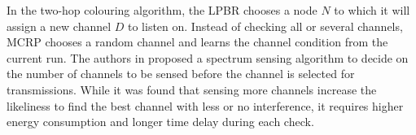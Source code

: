 


In the two-hop colouring algorithm, the LPBR chooses a node $N$ to which it will assign a new channel $D$ to listen on.
Instead of checking all or several channels, MCRP chooses a random channel and learns the channel condition from the current run. 
The authors in \cite{energyluca} proposed a spectrum sensing algorithm to decide on the number of channels to be sensed before the channel is selected for transmissions. While it was found that sensing more channels increase the likeliness to find the best channel with less or no interference, it requires higher energy consumption and longer time delay during each check. 

